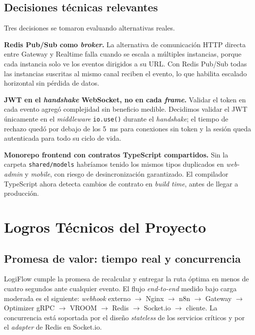 \documentclass[conference]{IEEEtran}
\begin{document}
\subsection{Decisiones t\'ecnicas relevantes}

Tres decisiones se tomaron evaluando alternativas reales.

\textbf{Redis Pub/Sub como \emph{broker}.} La alternativa de comunicaci\'on HTTP directa entre Gateway y Realtime falla cuando se escala a m\'ultiples instancias, porque cada instancia solo ve los eventos dirigidos a su URL. Con Redis Pub/Sub todas las instancias suscritas al mismo canal reciben el evento, lo que habilita escalado horizontal sin p\'erdida de datos.

\textbf{JWT en el \emph{handshake} WebSocket, no en cada \emph{frame}.} Validar el token en cada evento agreg\'o complejidad sin beneficio medible. Decidimos validar el JWT \'unicamente en el \emph{middleware} \texttt{io.use()} durante el \emph{handshake}; el tiempo de rechazo qued\'o por debajo de los 5~ms para conexiones sin token y la sesi\'on queda autenticada para todo su ciclo de vida.

\textbf{Monorepo frontend con contratos TypeScript compartidos.} Sin la carpeta \texttt{shared/models} habr\'iamos tenido los mismos tipos duplicados en \emph{web-admin} y \emph{mobile}, con riesgo de desincronizaci\'on garantizado. El compilador TypeScript ahora detecta cambios de contrato en \emph{build time}, antes de llegar a producci\'on.

\section{Logros T\'ecnicos del Proyecto}
\label{sec:logros}

\subsection{Promesa de valor: tiempo real y concurrencia}

LogiFlow cumple la promesa de recalcular y entregar la ruta \'optima en menos de cuatro segundos ante cualquier evento. El flujo \emph{end-to-end} medido bajo carga moderada es el siguiente: \emph{webhook} externo $\rightarrow$ Nginx $\rightarrow$ n8n $\rightarrow$ Gateway $\rightarrow$ Optimizer gRPC $\rightarrow$ VROOM $\rightarrow$ Redis $\rightarrow$ Socket.io $\rightarrow$ cliente. La concurrencia est\'a soportada por el dise\~no \emph{stateless} de los servicios cr\'iticos y por el \emph{adapter} de Redis en Socket.io.
\end{document}
